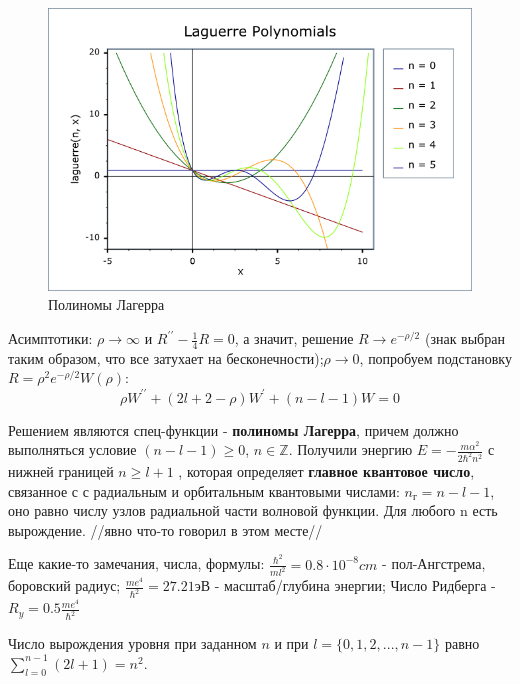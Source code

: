 \par \begin{figure} 
\vspace{-2ex}
\centering
\includegraphics[width=1\linewidth]{pictures/29.1.png}
\caption{Полиномы Лагерра}
\end{figure}
\par Асимптотики: $\rho \rightarrow \infty$ и $R^{\prime \prime} -\frac{1}{4} R=0$, а значит, решение $R\rightarrow e^{-\rho/2}$ (знак выбран таким образом, что все затухает на бесконечности);$\rho \rightarrow 0$, попробуем подстановку $R=\rho^2 e^{-\rho/2} W(\rho)$:
$$\rho W^{\prime \prime} +(2l+2-\rho)W^\prime +(n-l-1)W =0$$
\par Решением являются спец-функции - \textbf{полиномы Лагерра}, причем должно выполняться условие $(n-l-1)\geq 0$, $n \in \mathds{Z}$. Получили энергию $E=-\frac{m \alpha^2}{2\hbar^2 n^2}$ с нижней границей $n \geq l+1$ , которая определяет \textbf{главное квантовое число}, связанное с  с радиальным и орбитальным квантовыми числами: $n_г = n-l-1$, оно равно числу узлов радиальной части волновой функции. Для любого n есть вырождение. //явно что-то говорил в этом месте//
\par Еще какие-то замечания, числа, формулы:
$\frac{\hbar^2}{ml^2}=0.8 \cdot 10^{-8} cm$ - пол-Ангстрема, боровский радиус;
$\frac{me^4}{\hbar^2}=27.21 эВ$ - масштаб/глубина энергии;
Число Ридберга - $R_y = 0.5 \frac{me^4}{\hbar^2}$
\par Число вырождения уровня при заданном $n$ и при $l=\{ 0,1,2,...,n-1\}$ равно $\sum^{n-1}_{l=0} (2l+1)=n^2$.